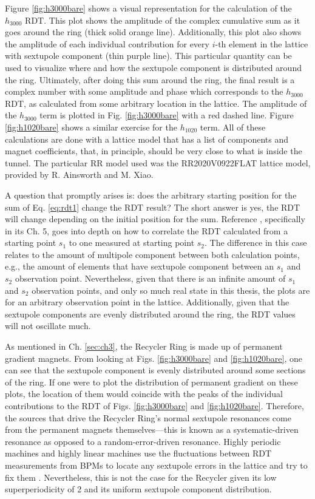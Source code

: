 Figure \ref{fig:h3000bare} shows a visual representation for the calculation of the $h_{3000}$ RDT. This plot shows the amplitude of the complex cumulative sum as it goes around the ring (thick solid orange line). Additionally, this plot also shows the amplitude of each individual contribution for every $i$-th element in the lattice with sextupole component (thin purple line). This particular quantity can be used to visualize where and how the sextupole component is distributed around the ring. Ultimately, after doing this sum around the ring, the final result is a complex number with some amplitude and phase which corresponds to the $h_{3000}$ RDT, as calculated from some arbitrary location in the lattice. The amplitude of the $h_{3000}$ term is plotted in Fig. \ref{fig:h3000bare} with a red dashed line. Figure \ref{fig:h1020bare} shows a similar exercise for the $h_{1020}$ term. All of these calculations are done with a lattice model that has a list of components and magnet coefficients, that, in principle, should be very close to what is inside the tunnel. The particular RR model used was the RR2020V0922FLAT lattice model, provided by R. Ainsworth and M. Xiao.

A question that promptly arises is: does the arbitrary starting position for the sum of Eq. \ref{eq:rdt1} change the RDT result? The short answer is yes, the RDT will change depending on the initial position for the sum. Reference \cite{cernthesis2}, specifically in its Ch. 5, goes into depth on how to correlate the RDT calculated from a starting point $s_1$ to one measured at starting point $s_2$. The difference in this case relates to the amount of multipole component between both calculation points, e.g., the amount of elements that have sextupole component between an $s_1$ and $s_2$ observation point. Nevertheless, given that there is an infinite amount of $s_1$ and $s_2$ observation points, and only so much real state in this thesis, the plots are for an arbitrary observation point in the lattice. Additionally, given that the sextupole components are evenly distributed around the ring, the RDT values will not oscillate much.

As mentioned in Ch. \ref{sec:ch3}, the Recycler Ring is made up of permanent gradient magnets. From looking at Figs. \ref{fig:h3000bare} and \ref{fig:h1020bare}, one can see that the sextupole component is evenly distributed around some sections of the ring. If one were to plot the distribution of permanent gradient on these plots, the location of them would coincide with the peaks of the individual contributions to the RDT of Figs. \ref{fig:h3000bare} and \ref{fig:h1020bare}. Therefore, the sources that drive the Recycler Ring's normal sextupole resonances come from the permanent magnets themselves---this is known as a systematic-driven resonance as opposed to a random-error-driven resonance. Highly periodic machines and highly linear machines use the fluctuations between RDT measurements from BPMs to locate any sextupole errors in the lattice and try to fix them \cite{cernthesis2}. Nevertheless, this is not the case for the Recycler given its low superperiodicity of 2 and its uniform sextupole component distribution.

